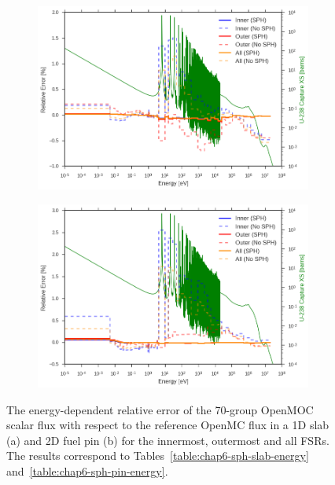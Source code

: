 \begin{figure}[h!]
\begin{subfigure}{.9\textwidth}
  \centering
  \includegraphics[width=\linewidth]{figures/sph/slab/rel-err-inner-outer}
  \caption{}
\end{subfigure}
\begin{subfigure}{.9\textwidth}
  \centering
  \includegraphics[width=\linewidth]{figures/sph/pin-cell/rel-err-inner-outer}
  \caption{}
\end{subfigure}
\caption[Flux relative error by energy group w/ SPH]{The energy-dependent relative error of the 70-group OpenMOC scalar flux with respect to the reference OpenMC flux in a 1D slab (a) and 2D fuel pin (b) for the innermost, outermost and all \ac{FSR}s. The results correspond to Tables~\ref{table:chap6-sph-slab-energy} and~\ref{table:chap6-sph-pin-energy}.}
\label{fig:chap6-rel-err-energy}
\end{figure}

